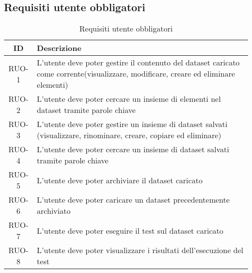 \subsection{Requisiti utente obbligatori}
\begin{table}[H]
    \begin{tabularx}{\textwidth}{|c|X|}
        \hline
        \textbf{ID} & \textbf{Descrizione} \\
        \hline
        \label{ru:RUO-1} RUO-1 & L'utente deve poter gestire il contenuto del dataset caricato come corrente(visualizzare, modificare, creare ed eliminare elementi)\\
        \label{ru:RUO-2} RUO-2 & L'utente deve poter cercare un insieme di elementi nel dataset tramite parole chiave \\
        \label{ru:RUO-3} RUO-3 & L'utente deve poter gestire un insieme di dataset salvati (visualizzare, rinominare, creare, copiare ed eliminare)\\
        \label{ru:RUO-4} RUO-4 & L'utente deve poter cercare un insieme di dataset salvati tramite parole chiave \\
        \label{ru:RUO-5} RUO-5 & L'utente deve poter archiviare il dataset caricato \\
        \label{ru:RUO-6} RUO-6 & L'utente deve poter caricare un dataset precedentemente archiviato \\
        \label{ru:RUO-7} RUO-7 & L'utente deve poter eseguire il test sul dataset caricato \\
        \label{ru:RUO-8} RUO-8 & L'utente deve poter visualizzare i risultati dell'esecuzione del test \\
        \hline
    \end{tabularx}
    \vspace{10px}
    \caption{Requisiti utente obbligatori}
\end{table}

